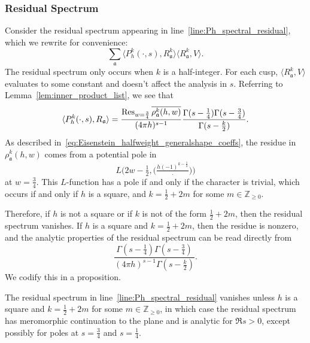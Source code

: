 \subsubsection*{Residual Spectrum}



Consider the residual spectrum appearing in line~\eqref{line:Ph_spectral_residual}, which
we rewrite for convenience:
\begin{equation}
  \sum_{\mathfrak{a}} \langle P_h^k(\cdot, s), R^k_{\mathfrak{a}} \rangle \langle
  R^k_{\mathfrak{a}}, V \rangle.
\end{equation}
The residual spectrum only occurs when $k$ is a half-integer.
For each cusp, $\langle R^k_{\mathfrak{a}}, V \rangle$ evaluates to some constant and
doesn't affect the analysis in $s$.
Referring to Lemma~\ref{lem:inner_product_list}, we see that
\begin{equation}
  \langle P_h^k(\cdot, s), R_{\mathfrak{a}} \rangle = \frac{\operatorname*{Res}_{w = \frac{3}{4}}
  \overline{\rho_\mathfrak{a}^k(h,w)}}{(4\pi h)^{s-1}} \frac{\Gamma(s - \frac{1}{4})
  \Gamma(s - \frac{3}{4})}{\Gamma(s - \frac{k}{2})}.
\end{equation}
As described in~\eqref{eq:Eisenstein_halfweight_generalshape_coeffs}, the residue in
$\rho_\mathfrak{a}^k(h,w)$ comes from a potential pole in
\begin{equation}
  L\Big(2w - \tfrac{1}{2}, \big( \tfrac{h (-1)^{k - \frac{1}{2}}}{\cdot}\big) \Big)
\end{equation}
at $w = \frac{3}{4}$.
This $L$-function has a pole if and only if the character is trivial, which occurs if and
only if $h$ is a square, and $k = \frac{1}{2} + 2m$ for some $m \in \mathbb{Z}_{\geq 0}$.


Therefore, if $h$ is not a square or if $k$ is not of the form $\frac{1}{2} + 2m$, then
the residual spectrum vanishes.
If $h$ is a square and $k = \frac{1}{2} + 2m$, then the residue is nonzero, and the
analytic properties of the residual spectrum can be read directly from
\begin{equation}\label{eq:hyperboloid:residual_analytic_descriptor}
  \frac{\Gamma(s - \frac{1}{4}) \Gamma(s - \frac{3}{4})}{(4\pi h)^{s-1} \Gamma(s -
  \frac{k}{2})}.
\end{equation}
We codify this in a proposition.


\begin{proposition}\label{prop:hyperboloid_residual_props}
  The residual spectrum in line~\eqref{line:Ph_spectral_residual} vanishes unless $h$ is a
  square and $k = \frac{1}{2} + 2m$ for some $m \in \mathbb{Z}_{\geq 0}$, in which case
  the residual spectrum has meromorphic continuation to the plane and is analytic for $\Re
  s > 0$, except possibly for poles at $s = \frac{3}{4}$ and $s = \frac{1}{4}$.
\end{proposition}



